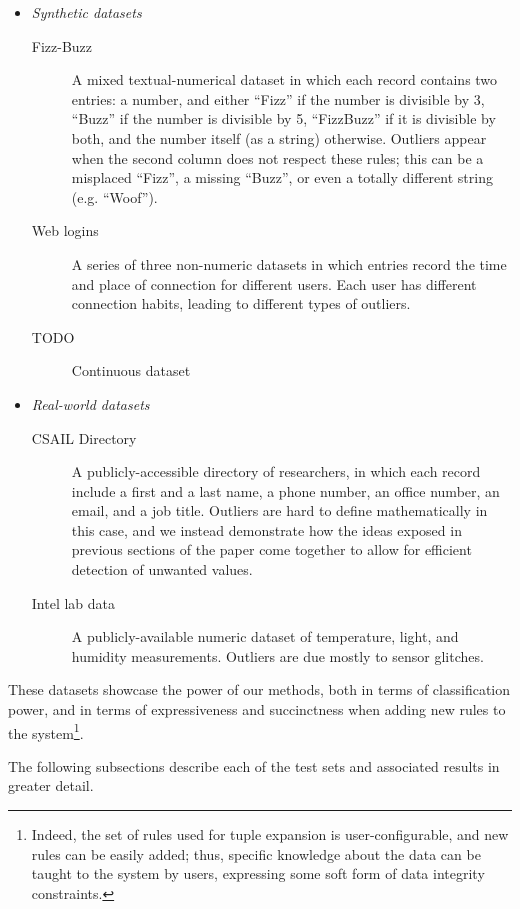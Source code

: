 \begin{itemize}
\item \emph{Synthetic datasets}
  \begin{description}
  \item[Fizz-Buzz] A mixed textual-numerical dataset in which each record contains two entries: a number, and either ``Fizz'' if the number is divisible by 3, ``Buzz'' if the number is divisible by 5, ``FizzBuzz'' if it is divisible by both, and the number itself (as a string) otherwise. Outliers appear when the second column does not respect these rules; this can be a misplaced ``Fizz'', a missing ``Buzz'', or even a totally different string (e.g. ``Woof'').
  \item[Web logins] A series of three non-numeric datasets in which entries record the time and place of connection for different users. Each user has different connection habits, leading to different types of outliers. %
  \item[TODO] Continuous dataset
  \end{description}
\item \emph{Real-world datasets}
  \begin{description}
  \item[CSAIL Directory] A publicly-accessible directory of researchers, in which each record include a first and a last name, a phone number, an office number, an email, and a job title. Outliers are hard to define mathematically in this case, and we instead demonstrate how the ideas exposed in previous sections of the paper come together to allow for efficient detection of unwanted values.
  \item[Intel lab data] A publicly-available numeric dataset of temperature, light, and humidity measurements. Outliers are due mostly to sensor glitches.
  \end{description}
\end{itemize}

These datasets showcase the power of our methods, both in terms of classification power, and in terms of expressiveness and succinctness when adding new rules to the system\footnote{Indeed, the set of rules used for tuple expansion is user-configurable, and new rules can be easily added; thus, specific knowledge about the data can be taught to the system by users, expressing some soft form of data integrity constraints.}.

The following subsections describe each of the test sets and associated results in greater detail.




%
%
